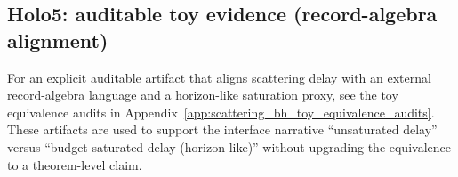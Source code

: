 \subsection{Holo5: auditable toy evidence (record-algebra alignment)}
\label{subsec:holo5_toy_evidence}

\AuditTag For an explicit auditable artifact that aligns scattering delay with an external record-algebra language and a horizon-like saturation proxy,
see the toy equivalence audits in Appendix~\ref{app:scattering_bh_toy_equivalence_audits}.
These artifacts are used to support the interface narrative ``unsaturated delay'' versus ``budget-saturated delay (horizon-like)''
without upgrading the equivalence to a theorem-level claim.

